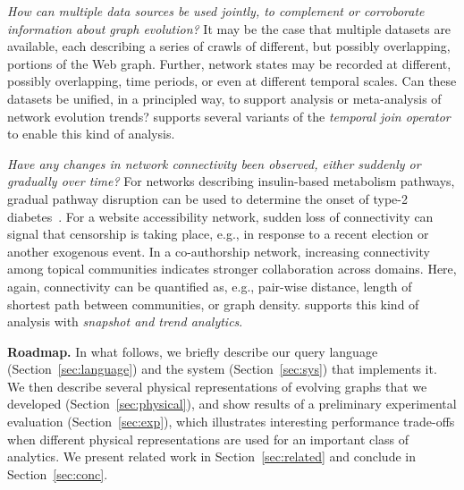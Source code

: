 {\em How can multiple data sources be used jointly, to complement or
  corroborate information about graph evolution?}  It may be the case
that multiple datasets are available, each describing a series of
crawls of different, but possibly overlapping, portions of the Web
graph.  Further, network states may be recorded at different, possibly
overlapping, time periods, or even at different temporal scales.  Can
these datasets be unified, in a principled way, to support analysis or
meta-analysis of network evolution trends?  \ql supports several
variants of the {\em temporal join operator} to enable this kind of
analysis.

{\em Have any changes in network connectivity been observed, either
  suddenly or gradually over time?}  For networks describing
insulin-based metabolism pathways, gradual pathway disruption can be
used to determine the onset of type-2
diabetes~\cite{DBLP:journals/tcsb/BeyerTLSF10}.  For a website
accessibility network, sudden loss of connectivity can signal that
censorship is taking place, e.g., in response to a recent election or
another exogenous event.  In a co-authorship network, increasing
connectivity among topical communities indicates stronger
collaboration across domains.  Here, again, connectivity can be
quantified as, e.g., pair-wise distance, length of shortest path
between communities, or graph density.  \ql supports this kind of
analysis with {\em snapshot and trend analytics}.

{\bf Roadmap.} In what follows, we briefly describe our query language
(Section~\ref{sec:language}) and the system (Section~\ref{sec:sys})
that implements it.  We then describe several physical representations
of evolving graphs that we developed (Section~\ref{sec:physical}), and
show results of a preliminary experimental evaluation
(Section~\ref{sec:exp}), which illustrates interesting performance
trade-offs when different physical representations are used for an
important class of analytics.  We present related work in
Section~\ref{sec:related} and conclude in Section~\ref{sec:conc}.



